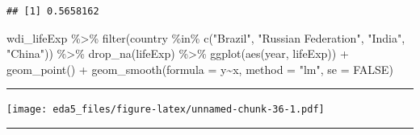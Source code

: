 \documentclass[
]{article}
\newenvironment{Shaded}{\begin{snugshade}}{\end{snugshade}}
\newcommand{\AttributeTok}[1]{\textcolor[rgb]{0.77,0.63,0.00}{#1}}
\newcommand{\ConstantTok}[1]{\textcolor[rgb]{0.00,0.00,0.00}{#1}}
\newcommand{\FunctionTok}[1]{\textcolor[rgb]{0.00,0.00,0.00}{#1}}
\newcommand{\NormalTok}[1]{#1}
\newcommand{\OtherTok}[1]{\textcolor[rgb]{0.56,0.35,0.01}{#1}}
\newcommand{\SpecialCharTok}[1]{\textcolor[rgb]{0.00,0.00,0.00}{#1}}
\newcommand{\StringTok}[1]{\textcolor[rgb]{0.31,0.60,0.02}{#1}}
\begin{document}
\begin{Shaded}
\end{Shaded}

\begin{verbatim}
## [1] 0.5658162
\end{verbatim}

\begin{Shaded}
\begin{Highlighting}[]
\NormalTok{wdi\_lifeExp }\SpecialCharTok{\%\textgreater{}\%} \FunctionTok{filter}\NormalTok{(country }\SpecialCharTok{\%in\%} \FunctionTok{c}\NormalTok{(}\StringTok{"Brazil"}\NormalTok{, }\StringTok{"Russian Federation"}\NormalTok{, }\StringTok{"India"}\NormalTok{, }\StringTok{"China"}\NormalTok{)) }\SpecialCharTok{\%\textgreater{}\%} \FunctionTok{drop\_na}\NormalTok{(lifeExp) }\SpecialCharTok{\%\textgreater{}\%}
  \FunctionTok{ggplot}\NormalTok{(}\FunctionTok{aes}\NormalTok{(year, lifeExp)) }\SpecialCharTok{+} \FunctionTok{geom\_point}\NormalTok{() }\SpecialCharTok{+} \FunctionTok{geom\_smooth}\NormalTok{(}\AttributeTok{formula =}\NormalTok{ y}\SpecialCharTok{\textasciitilde{}}\NormalTok{x, }\AttributeTok{method =} \StringTok{"lm"}\NormalTok{, }\AttributeTok{se =} \ConstantTok{FALSE}\NormalTok{)}
\end{Highlighting}
\end{Shaded}

\begin{center}\rule{0.5\linewidth}{0.5pt}\end{center}

\texttt{[image: eda5\_files/figure-latex/unnamed-chunk-36-1.pdf]}

\begin{center}\rule{0.5\linewidth}{0.5pt}\end{center}
\end{document}

